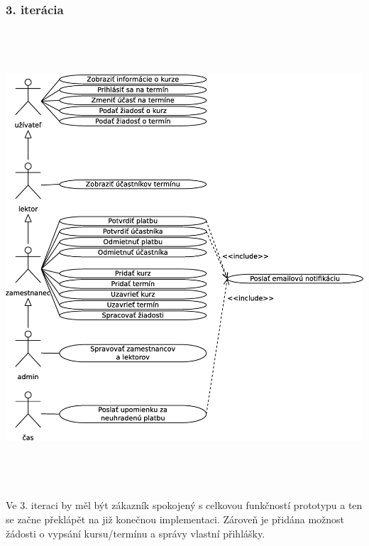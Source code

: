 \documentclass[12pt,a4paper,titlepage,final]{report}
\begin{document}
	\subsubsection{3. iterácia}
		\begin{center}
			\captionsetup{type=figure}
			\includegraphics[height=17cm]{img/use_case_iter3.eps}
		\end{center}
		
Ve 3. iteraci by měl být zákazník spokojený s celkovou funkčností prototypu a ten se začne překlápět na již konečnou implementaci. Zároveň je přidána možnost žádosti o vypsání kursu/termínu a správy vlastní přihlášky.
	
\end{document}
